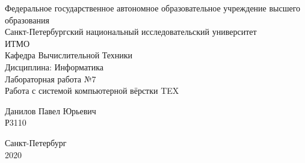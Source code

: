 \begin{center}
Федеральное государственное автономное образовательное учреждение высшего  \\
образования \\
Санкт-Петербургский национальный исследовательский университет \\
ИТМО\\
\vspace{1cm}
Кафедра Вычислительной Техники \\
Дисциплина: Информатика \\ \vspace{5cm}
Лабораторная работа №7 \\
Работа с системой компьютерной вёрстки TEX \vspace{5cm}
\end{center}
\begin{flushright}
Данилов Павел Юрьевич \\
Р3110 \\
\end{flushright}
\null\vfill
\begin{center}
Санкт-Петербург \\ 
2020
\end{center}